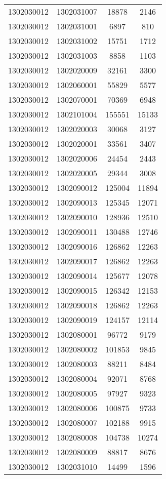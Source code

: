 \begin{longtable}[h]{llcc}
		1302030012 & 1302031007 & 18878 & 2146\\
		1302030012 & 1302031001 & 6897 & 810\\
		1302030012 & 1302031002 & 15751 & 1712\\
		1302030012 & 1302031003 & 8858 & 1103\\
		1302030012 & 1302020009 & 32161 & 3300\\
		1302030012 & 1302060001 & 55829 & 5577\\
		1302030012 & 1302070001 & 70369 & 6948\\
		1302030012 & 1302101004 & 155551 & 15133\\
		1302030012 & 1302020003 & 30068 & 3127\\
		1302030012 & 1302020001 & 33561 & 3407\\
		1302030012 & 1302020006 & 24454 & 2443\\
		1302030012 & 1302020005 & 29344 & 3008\\
		1302030012 & 1302090012 & 125004 & 11894\\
		1302030012 & 1302090013 & 125345 & 12071\\
		1302030012 & 1302090010 & 128936 & 12510\\
		1302030012 & 1302090011 & 130488 & 12746\\
		1302030012 & 1302090016 & 126862 & 12263\\
		1302030012 & 1302090017 & 126862 & 12263\\
		1302030012 & 1302090014 & 125677 & 12078\\
		1302030012 & 1302090015 & 126342 & 12153\\
		1302030012 & 1302090018 & 126862 & 12263\\
		1302030012 & 1302090019 & 124157 & 12114\\
		1302030012 & 1302080001 & 96772 & 9179\\
		1302030012 & 1302080002 & 101853 & 9845\\
		1302030012 & 1302080003 & 88211 & 8484\\
		1302030012 & 1302080004 & 92071 & 8768\\
		1302030012 & 1302080005 & 97927 & 9323\\
		1302030012 & 1302080006 & 100875 & 9733\\
		1302030012 & 1302080007 & 102188 & 9915\\
		1302030012 & 1302080008 & 104738 & 10274\\
		1302030012 & 1302080009 & 88817 & 8676\\
		1302030012 & 1302031010 & 14499 & 1596\\

\end{longtable}
